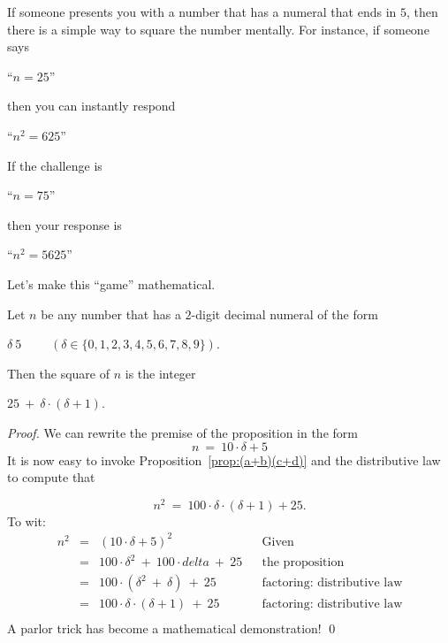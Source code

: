 If someone presents you with a number that has a numeral that ends in
$5$, then there is a simple way to square the number mentally.  For
instance, if someone says

\hspace{.25in}``$n = 25$''

\noindent
then you can instantly respond

\hspace{.25in}``$n^2 = 625$''

\noindent
If the challenge is

\hspace{.25in}``$n = 75$''

\noindent
then your response is

\hspace{.25in}``$n^2 = 5625$''

\noindent
Let's make this ``game'' mathematical.

\begin{prop}
\label{thm:75x65=4925}
Let $n$ be any number that has a $2$-digit decimal numeral of the form

\hspace{.25in}$\delta \ 5$ \ \ \ \ $(\delta \in \{ 0,1,2,3,4,5,6,7,8,9\})$.

\noindent
Then the square of $n$ is the integer

\hspace{.25in}$25 \ + \ \delta \cdot (\delta +1)$. 
\end{prop}

\begin{proof}
We can rewrite the premise of the proposition in the form
\[ n \ = \ 10 \cdot \delta + 5 \]
It is now easy to invoke Proposition~\ref{prop:(a+b)(c+d)} and the
distributive law to compute that

\[ n^2 \ = \ 100 \cdot \delta \cdot (\delta+1) + 25. \]
To wit: 
\[
\begin{array}{lclll}
n^2 & = & (10 \cdot \delta + 5)^2 & & \mbox{Given} \\
    & = & 100 \cdot \delta^2 \ + \ 100 \cdot delta \ + \ 25
              & & \mbox{the proposition} \\
    & = & 100 \cdot (\delta^2 \ + \ \delta) \ + \ 25
              & & \mbox{factoring: distributive law} \\
    & = & 100 \cdot \delta \cdot (\delta + 1) \ + \ 25
              & & \mbox{factoring: distributive law} \\
\end{array}
\]
A parlor trick has become a mathematical demonstration!
\qed
\end{proof}


